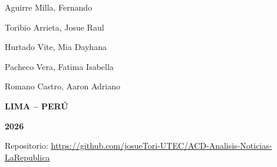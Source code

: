 \documentclass[12pt,a4paper]{article}
\begin{document}
\begin{titlepage}
\begin{center}
        {\small
        Aguirre Milla, Fernando\par
        \vspace{0.15cm}
        Toribio Arrieta, Josue Raul\par
        \vspace{0.15cm}
        Hurtado Vite, Mia Dayhana\par
        \vspace{0.15cm}
        Pacheco Vera, Fatima Isabella\par
        \vspace{0.15cm}
        Romano Castro, Aaron Adriano\par
        }

        \vfill

        {\bfseries LIMA -- PERÚ\par}

        \vspace{0.1cm}

        {\bfseries 2026\par}

        \vspace{0.3cm}

        {\small Repositorio: \url{https://github.com/josueTori-UTEC/ACD-Analisis-Noticias-LaRepublica}\par}

    \end{center}
\end{titlepage}

\setcounter{page}{1}
\begin{abstract}
Se trabajó con 1\,116 noticias de La República recopiladas por scraping en la Parte I. Se construyó un pipeline reproducible que limpia, integra, reduce y transforma los datos hasta un dataset de 31 variables, y se analizó cómo se distribuyen las noticias por sección, autor, hora, fecha y características del titular.

Los resultados principales son tres. Primero, la muestra está muy sesgada hacia el tiempo del scraping: el \textbf{43,4\,\%} de las noticias es de agosto y septiembre de 2026, y la composición por sección cambia mucho de un año a otro (V de Cramér = 0,61). Segundo, \texttt{fecha} es siempre igual o posterior a la fecha escrita en la URL, difiere en el \textbf{38,4\,\%} de los casos y llega a 1\,632 días de diferencia, por lo que probablemente no sea siempre la fecha de publicación. Tercero, el estilo del titular (cifras, comillas, preguntas) y el horario dependen del área editorial, con tamaños de efecto moderados.
\end{abstract}
\newpage
\tableofcontents
\newpage
\end{document}

